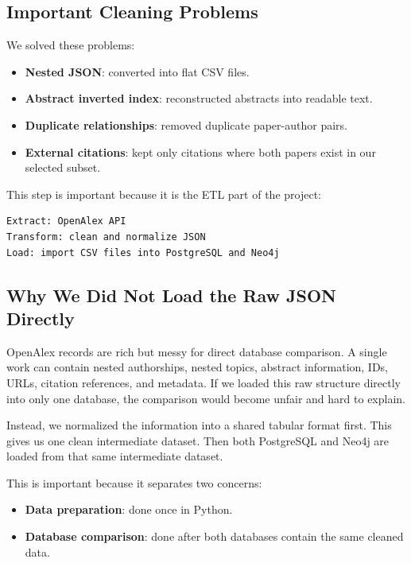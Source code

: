 \documentclass[11pt]{article}
\begin{document}
\subsection{Important Cleaning Problems}

We solved these problems:

\begin{itemize}
    \item \textbf{Nested JSON}: converted into flat CSV files.
    \item \textbf{Abstract inverted index}: reconstructed abstracts into readable text.
    \item \textbf{Duplicate relationships}: removed duplicate paper-author pairs.
    \item \textbf{External citations}: kept only citations where both papers exist in our selected subset.
\end{itemize}

This step is important because it is the ETL part of the project:

\begin{verbatim}
Extract: OpenAlex API
Transform: clean and normalize JSON
Load: import CSV files into PostgreSQL and Neo4j
\end{verbatim}

\subsection{Why We Did Not Load the Raw JSON Directly}

OpenAlex records are rich but messy for direct database comparison.
A single work can contain nested authorships, nested topics, abstract information, IDs, URLs, citation references, and metadata.
If we loaded this raw structure directly into only one database, the comparison would become unfair and hard to explain.

Instead, we normalized the information into a shared tabular format first.
This gives us one clean intermediate dataset.
Then both PostgreSQL and Neo4j are loaded from that same intermediate dataset.

This is important because it separates two concerns:

\begin{itemize}
    \item \textbf{Data preparation}: done once in Python.
    \item \textbf{Database comparison}: done after both databases contain the same cleaned data.
\end{itemize}
\end{document}
